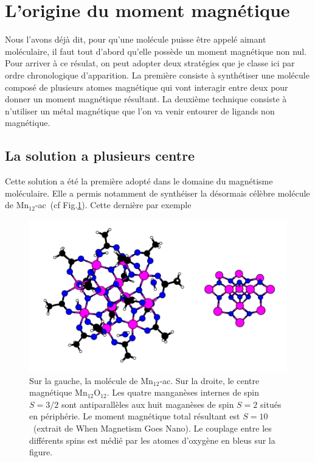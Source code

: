 \section{L'origine du moment magnétique}
Nous l'avons déjà dit, pour qu'une molécule puisse \^etre appelé aimant moléculaire, il faut tout d'abord qu'elle possède un moment magnétique non nul. Pour arriver à ce résulat, on peut adopter deux stratégies que je classe ici par ordre chronologique d'apparition. La première consiste à synthétiser une molécule composé de plusieurs atomes magnétique qui vont interagir entre deux pour donner un moment magnétique résultant. La deuxième technique consiste à n'utiliser un métal magnétique que l'on va venir entourer de ligands non magnétique.

\subsection{La solution a plusieurs centre}
Cette solution a été la première adopté dans le domaine du magnétisme moléculaire. Elle a permis notamment de synthéiser la désormais célèbre molécule de Mn$_{12}$-ac~(cf Fig.\ref{Mn12}). Cette dernière par exemple

\begin{figure}
\centering \includegraphics[scale=0.3]{Theorie/MagMol/figure1/Mn12.png} 
\caption{Sur la gauche, la molécule de Mn$_{12}$-ac. Sur la droite, le centre magnétique Mn$_{12}$O$_{12}$. Les quatre manganèses internes de spin $S=3/2$ sont antiparallèles aux huit maganèses de spin $S=2$ situés en périphérie. Le moment magnétique total résultant est $S=10$~(extrait de When Magnetism Goes Nano). Le couplage entre les différents spins est médié par les atomes d'oxygène en bleus sur la figure.}
\label{Mn12}
\end{figure}